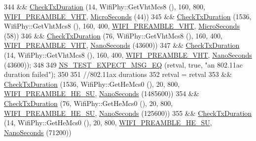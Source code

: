 \begin{DoxyCode}
344     && \hyperlink{classTxDurationTest_ac86b852957ecf1a1bed4f4e48debb30e}{CheckTxDuration} (14, WifiPhy::GetVhtMcs8 (), 160, 800, 
      \hyperlink{group__wifi_gga5e94a56cb338a14ffbbb19c6a41251ebab90b0fe0b17f27e51c0fe16239e7b089}{WIFI\_PREAMBLE\_VHT}, \hyperlink{group__timecivil_ga17465a639c8d1464e76538afdd78a9f0}{MicroSeconds} (44))
345     && \hyperlink{classTxDurationTest_ac86b852957ecf1a1bed4f4e48debb30e}{CheckTxDuration} (1536, WifiPhy::GetVhtMcs8 (), 160, 400, 
      \hyperlink{group__wifi_gga5e94a56cb338a14ffbbb19c6a41251ebab90b0fe0b17f27e51c0fe16239e7b089}{WIFI\_PREAMBLE\_VHT}, \hyperlink{group__timecivil_ga17465a639c8d1464e76538afdd78a9f0}{MicroSeconds} (58))
346     && \hyperlink{classTxDurationTest_ac86b852957ecf1a1bed4f4e48debb30e}{CheckTxDuration} (76, WifiPhy::GetVhtMcs8 (), 160, 400, 
      \hyperlink{group__wifi_gga5e94a56cb338a14ffbbb19c6a41251ebab90b0fe0b17f27e51c0fe16239e7b089}{WIFI\_PREAMBLE\_VHT}, \hyperlink{group__timecivil_ga281d64bcb4dad96267d83c7688ec433f}{NanoSeconds} (43600))
347     && \hyperlink{classTxDurationTest_ac86b852957ecf1a1bed4f4e48debb30e}{CheckTxDuration} (14, WifiPhy::GetVhtMcs8 (), 160, 400, 
      \hyperlink{group__wifi_gga5e94a56cb338a14ffbbb19c6a41251ebab90b0fe0b17f27e51c0fe16239e7b089}{WIFI\_PREAMBLE\_VHT}, \hyperlink{group__timecivil_ga281d64bcb4dad96267d83c7688ec433f}{NanoSeconds} (43600));
348 
349   \hyperlink{group__testing_ga7304ba46a28d8cf08dfdfd6499cf7068}{NS\_TEST\_EXPECT\_MSG\_EQ} (retval, \textcolor{keyword}{true}, \textcolor{stringliteral}{"an 802.11ac duration failed"});
350 
351   \textcolor{comment}{//802.11ax durations}
352   retval = retval
353     && \hyperlink{classTxDurationTest_ac86b852957ecf1a1bed4f4e48debb30e}{CheckTxDuration} (1536, WifiPhy::GetHeMcs0 (), 20, 800, 
      \hyperlink{group__wifi_gga5e94a56cb338a14ffbbb19c6a41251eba99c3e12c6e91fc9a9bee491d20dab807}{WIFI\_PREAMBLE\_HE\_SU}, \hyperlink{group__timecivil_ga281d64bcb4dad96267d83c7688ec433f}{NanoSeconds} (1485600))
354     && \hyperlink{classTxDurationTest_ac86b852957ecf1a1bed4f4e48debb30e}{CheckTxDuration} (76, WifiPhy::GetHeMcs0 (), 20, 800, 
      \hyperlink{group__wifi_gga5e94a56cb338a14ffbbb19c6a41251eba99c3e12c6e91fc9a9bee491d20dab807}{WIFI\_PREAMBLE\_HE\_SU}, \hyperlink{group__timecivil_ga281d64bcb4dad96267d83c7688ec433f}{NanoSeconds} (125600))
355     && \hyperlink{classTxDurationTest_ac86b852957ecf1a1bed4f4e48debb30e}{CheckTxDuration} (14, WifiPhy::GetHeMcs0 (), 20, 800, 
      \hyperlink{group__wifi_gga5e94a56cb338a14ffbbb19c6a41251eba99c3e12c6e91fc9a9bee491d20dab807}{WIFI\_PREAMBLE\_HE\_SU}, \hyperlink{group__timecivil_ga281d64bcb4dad96267d83c7688ec433f}{NanoSeconds} (71200))

\end{DoxyCode}
